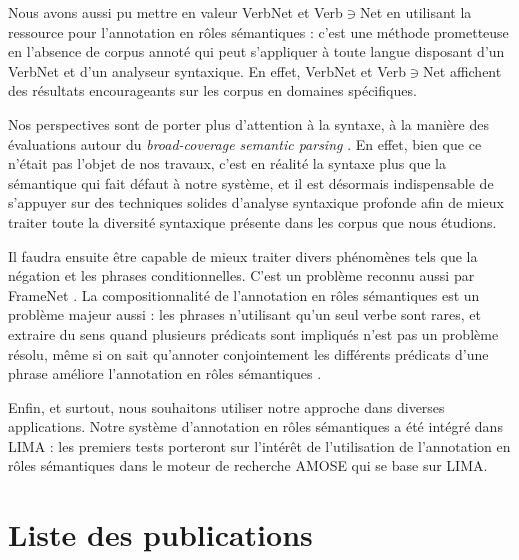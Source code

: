 \documentclass[oneside,parskip]{scrbook}
\newcommand{\verbenet}{Verb$\ni$Net}
\begin{document}
Nous avons aussi pu mettre en valeur VerbNet et \verbenet{} en utilisant la
ressource pour l'annotation en rôles sémantiques : c'est une méthode
prometteuse en l'absence de corpus annoté qui peut s'appliquer à toute langue
disposant d'un VerbNet et d'un analyseur syntaxique. En effet, VerbNet et
\verbenet{} affichent des résultats encourageants sur les corpus en domaines
spécifiques.

Nos perspectives sont de porter plus d'attention à la syntaxe, à la manière des
évaluations autour du \textit{broad-coverage semantic parsing}
\citep{oepen2014broad}. En effet, bien que ce n'était pas l'objet de nos
travaux, c'est en réalité la syntaxe plus que la sémantique qui fait défaut à
notre système, et il est désormais indispensable de s'appuyer sur des
techniques solides d'analyse syntaxique profonde afin de mieux traiter toute la
diversité syntaxique présente dans les corpus que nous étudions.

Il faudra ensuite être capable de mieux traiter divers phénomènes tels que la
négation et les phrases conditionnelles. C'est un problème reconnu aussi par
FrameNet \citep{baker2014framenet}. La compositionnalité de l'annotation en
rôles sémantiques est un problème majeur aussi : les phrases n'utilisant qu'un
seul verbe sont rares, et extraire du sens quand plusieurs prédicats sont
impliqués n'est pas un problème résolu, même si on sait qu'annoter
conjointement les différents prédicats d'une phrase améliore l'annotation en
rôles sémantiques \citep{yang2014multi}.

Enfin, et surtout, nous souhaitons utiliser notre approche dans diverses
applications. Notre système d'annotation en rôles sémantiques a été intégré
dans LIMA : les premiers tests porteront sur l'intérêt de l'utilisation de
l'annotation en rôles sémantiques dans le moteur de recherche AMOSE qui se base
sur LIMA.


\backmatter




\chapter{Liste des publications}
\end{document}

